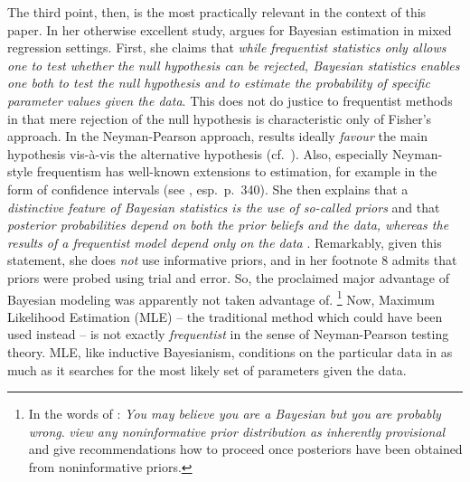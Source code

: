 \documentclass[USenglish]{article}
\begin{document}
The third point, then, is the most practically relevant in the context of this paper.
In her otherwise excellent study, \citet[251--252]{Levshina2016} argues for Bayesian estimation in mixed regression settings.
First, she claims that \textit{while frequentist statistics only allows one to test whether the null hypothesis can be rejected, Bayesian statistics enables one both to test the null hypothesis and to estimate the probability of specific parameter values given the data}.
This does not do justice to frequentist methods in that mere rejection of the null hypothesis is characteristic only of Fisher's approach.
In the Neyman-Pearson approach, results ideally \textit{favour} the main hypothesis vis-à-vis the alternative hypothesis (cf.\ \citealp{Lehmann1993,Lehmann2011,Perezgonzalez2015}).
Also, especially Neyman-style frequentism has well-known extensions to estimation, for example in the form of confidence intervals (see \citealp{GreenlandEa2016}, esp.\ p.\ 340).
She then explains that a \textit{distinctive feature of Bayesian statistics is the use of so-called priors} and that \textit{posterior probabilities depend on both the prior beliefs and the data, whereas the results of a frequentist model depend only on the data} \cite[252]{Levshina2016}.
Remarkably, given this statement, she does \textit{not} use informative priors, and in her footnote 8 \cite[252]{Levshina2016} admits that priors were probed using trial and error.
So, the proclaimed major advantage of Bayesian modeling was apparently not taken advantage of.%
\footnote{In the words of \cite{Senn2011}: \textit{You may believe you are a Bayesian but you are probably wrong}.
\citet[347--348]{GelmanHill2006} \textit{view any noninformative prior distribution as inherently provisional} and give recommendations how to proceed once posteriors have been obtained from noninformative priors.}
Now, Maximum Likelihood Estimation (MLE) -- the traditional method which could have been used instead -- is not exactly \textit{frequentist} in the sense of Neyman-Pearson testing theory.
MLE, like inductive Bayesianism, conditions on the particular data in as much as it searches for the most likely set of parameters given the data.
\end{document}
